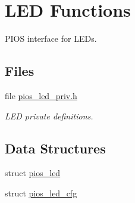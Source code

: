 \hypertarget{group___p_i_o_s___l_e_d}{\section{L\-E\-D Functions}
\label{group___p_i_o_s___l_e_d}
}


P\-I\-O\-S interface for L\-E\-Ds.  


\subsection*{Files}
\begin{DoxyCompactItemize}
\item 
file \hyperlink{pios__led__priv_8h}{pios\-\_\-led\-\_\-priv.\-h}
\begin{DoxyCompactList}\small\item\em L\-E\-D private definitions. \end{DoxyCompactList}\end{DoxyCompactItemize}
\subsection*{Data Structures}
\begin{DoxyCompactItemize}
\item 
struct \hyperlink{structpios__led}{pios\-\_\-led}
\item 
struct \hyperlink{structpios__led__cfg}{pios\-\_\-led\-\_\-cfg}
\end{DoxyCompactItemize}
